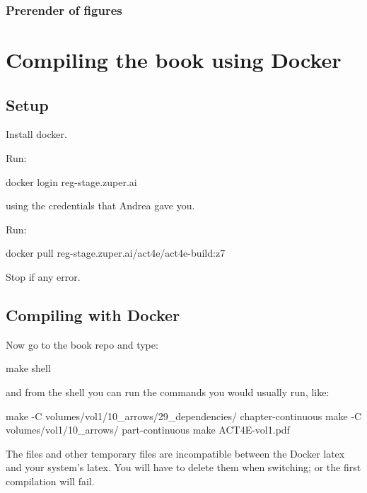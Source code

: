 
\subsubsection{Prerender of figures}


\section{Compiling the book using Docker}

\subsection{Setup}

Install docker.

Run:

\begin{console}
docker login reg-stage.zuper.ai
\end{console}

using the credentials that Andrea gave you.

Run:

\begin{console}
docker pull reg-stage.zuper.ai/act4e/act4e-build:z7
\end{console}

Stop if any error.




\subsection{Compiling with Docker}

Now go to the book repo and type:

\begin{console}
 make shell
\end{console}

and from the shell you can run the commands you would usually run, like:

\begin{console}
make -C volumes/vol1/10_arrows/29_dependencies/ chapter-continuous
make -C volumes/vol1/10_arrows/ part-continuous
make ACT4E-vol1.pdf
\end{console}

\begin{remark}
The  files and other temporary files are incompatible between the Docker latex and your system's latex. You will have to delete them when switching; or the first compilation will fail.
\end{remark}

